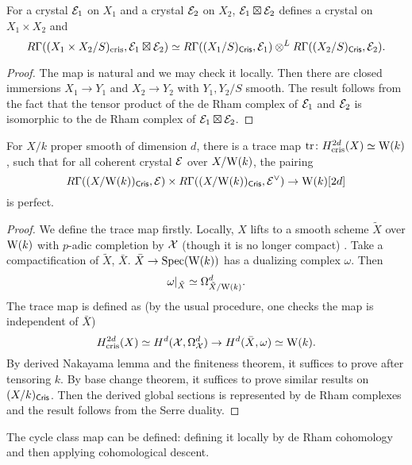 \begin{theorem}
    For a crystal ${\mathcal {E}}_1$ on $X_1$ and a crystal ${\mathcal {E}}_2$ on $X_2$, 
    ${\mathcal {E}}_1 \boxtimes {\mathcal {E}}_2$ defines a crystal on $X_1\times X_2$ and 
    \[
        R \Gamma ((X_1\times X_2/S)_{\mathrm{cris}}, {\mathcal {E}}_1 \boxtimes {\mathcal {E}}_2) \simeq 
        R \Gamma((X_1/S)_{\mathsf{Cris}}, {\mathcal {E}}_1) \otimes^{L} R \Gamma ((X_2/S)_{\mathsf{Cris}}, {\mathcal {E}}_2).
    \]
\end{theorem}
\begin{proof}
    The map is natural and we may check it locally. 
    Then there are closed immersions $X_1\to Y_1$ 
    and $X_2\to Y_2$ with $Y_1,Y_2/S$ smooth. 
    The result follows from the fact that 
    the tensor product of the de Rham complex of ${\mathcal {E}}_1$ and ${\mathcal {E}}_2$ 
    is isomorphic to the de Rham complex of ${\mathcal {E}}_1\boxtimes {\mathcal {E}}_2$.
\end{proof}
\begin{theorem}
    For $X/k$ proper smooth of dimension $d$, 
    there is a trace map $\operatorname{tr}\colon H^{2d}_{\mathrm{cris}}(X)\simeq \mathrm{W}(k)$, 
    such that for all coherent crystal ${\mathcal {E}}$ over $X/\mathrm{W}(k)$, the pairing
    \[
        R\Gamma((X/\mathrm{W}(k))_{\mathsf{Cris}}, {\mathcal {E}}) \times 
        R \Gamma((X/\mathrm{W}(k))_{\mathsf{Cris}}, {\mathcal {E}}^\vee) \to \mathrm{W}(k)[2d]
    \]
    is perfect.
\end{theorem}
\begin{proof}
    We define the trace map firstly. 
    Locally, $X$ lifts to a smooth scheme $\tilde{X}$ over $\mathrm{W}(k)$ 
    with $p$-adic completion by ${\mathcal {X}}$ (though it is no longer compact)
    . Take a compactification of $\tilde{X}$, $\bar{X}$. 
    $\bar{X} \to \operatorname{Spec} (\mathrm{W}(k))$ has a dualizing complex $\omega$. 
    Then
    \[
        \omega|_{\tilde{X}} \simeq \Omega_{\tilde{X}/\mathrm{W}(k)}^d.
    \]
    The trace map is defined as (by the usual procedure, 
    one checks the map is independent of $\bar{X}$)
    \[
        H^{2d}_{\mathrm{cris}}(X) \simeq 
        H^d({\mathcal {X}},\Omega_{{\mathcal {X}}}^d) \to H^d(\bar{X},\omega) \simeq \mathrm{W}(k).
    \]
    By derived Nakayama lemma and the finiteness theorem, 
    it suffices to prove after tensoring $k$. By base change theorem, 
    it suffices to prove similar results on $(X/k)_{\mathsf{Cris}}$. 
    Then the derived global sections is represented by de Rham complexes 
    and the result follows from the Serre duality.
\end{proof}

\begin{remark}
    The cycle class map can be defined: 
    defining it locally by de Rham cohomology 
    and then applying cohomological descent.
\end{remark}

